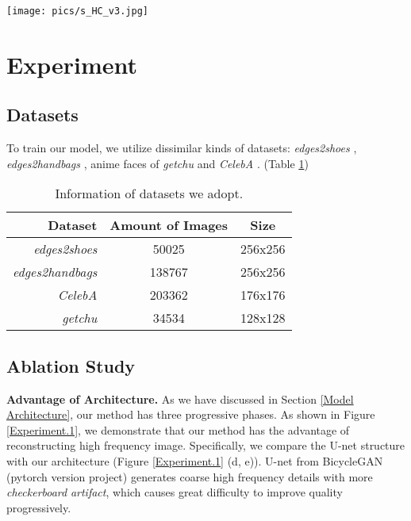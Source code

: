 \documentclass[10pt,twocolumn,letterpaper]{article} \usepackage{amsfonts,amssymb}
\begin{document}
\begin{figure*}[t]
\centering



\texttt{[image: pics/s\_HC\_v3.jpg]}

\caption{(a) \textbf{Results across different sparsity-level inputs.} Owing to HC operation when training, we confirm that our model is not sensitive to certain fixed set of hyperparameters for testing. (b) \textbf{Comparison between output results with or without HC operation.} When employing HC operation in training, we can obtain better quality on local details and still get satisfactory outputs from extreme sparse content or style.}
\label{Experiment.2}
\end{figure*}


\section{Experiment}
\subsection{Datasets} \label{Datasets}
To train our model, we utilize dissimilar kinds of datasets: \emph{edges2shoes} \cite{isola2017image}, \emph{edges2handbags} \cite{isola2017image}, anime faces of \emph{getchu} \cite{jin2017towards} and \emph{CelebA} \cite{liu2015deep}. (Table \ref{dataset})

\begin{table}[ht]
\begin{tabular}{rcc}
\toprule
\multicolumn{1}{r}{Dataset} & Amount of Images & Size \\
\midrule
\textit{edges2shoes} & 50025 & 256x256 \\
\textit{edges2handbags} & 138767 & 256x256 \\
\textit{CelebA} & 203362 & 176x176 \\
\textit{getchu} & 34534 & 128x128 \\
\bottomrule
\end{tabular}
\caption{Information of datasets we adopt.}
\label{dataset}
\end{table}


\subsection{Ablation Study} \label{Ablation Study}
{\bf Advantage of Architecture.}
As we have discussed in Section \ref{Model Architecture}, our method has three progressive phases. As shown in Figure \ref{Experiment.1}, we demonstrate that our method has the advantage of reconstructing high frequency image. Specifically, we compare the U-net structure \cite{ronneberger2015u} with our  architecture (Figure \ref{Experiment.1} (d, e)). U-net from BicycleGAN \cite{zhu2017toward} (pytorch version project) generates coarse high frequency details with more \emph{checkerboard}  \emph{artifact}, which causes great difficulty to improve quality pro\-gre\-ssive\-ly.
\end{document}

